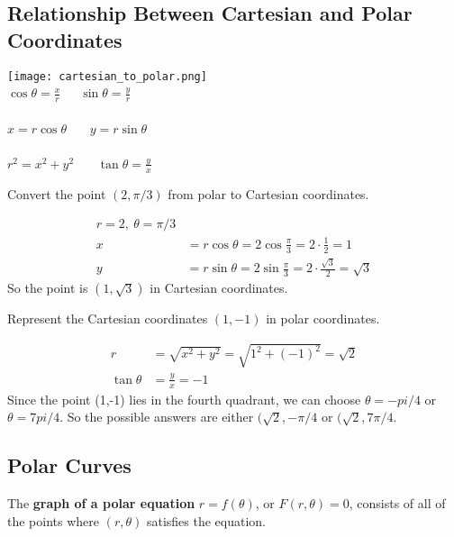   \subsection*{Relationship Between Cartesian and Polar Coordinates}
    \begin{center}
      \texttt{[image: cartesian\_to\_polar.png]} \\
      $\cos\theta = \frac{x}{r}$\ \ \ $\sin\theta = \frac{y}{r}$ \\~\\
      $x=r\cos\theta$ \ \ \  $y=r\sin\theta$ \\~\\
      $r^2 = x^2 + y^2$ \ \ \  $\tan\theta = \frac{y}{x}$
    \end{center}
    \begin{example}
      Convert the point $(2,\pi/3)$ from polar to Cartesian coordinates.
    \end{example}
    \begin{solution}
      \begin{align*}
        r=2,\ \theta=\pi/3 \\
        x&=r\cos\theta = 2\cos\frac{\pi}{3}=2\cdot\frac{1}{2}=1 \\
        y&=r\sin\theta = 2\sin\frac{\pi}{3}=2\cdot\frac{\sqrt{3}}{2}=\sqrt{3}
      \end{align*}
      So the point is $(1,\sqrt{3})$ in Cartesian coordinates.
    \end{solution}
    \begin{example}
      Represent the Cartesian coordinates $(1,-1)$ in polar coordinates.
    \end{example}
    \begin{solution}
      \begin{align*}
        r&=\sqrt{x^2 + y^2}=\sqrt{1^2 + (-1)^2} = \sqrt{2} \\
        \tan\theta &= \frac{y}{x} = -1
      \end{align*}
      Since the point (1,-1) lies in the fourth quadrant, we can choose $\theta=-pi/4$ or $\theta=7pi/4$. So the possible answers are either $(\sqrt{2},-\pi/4$ or $(\sqrt{2},7\pi/4$.
    \end{solution}
  \subsection*{Polar Curves}
    The \textbf{graph of a polar equation} $r=f(\theta)$, or $F(r,\theta) = 0$, consists of all of the points where $(r,\theta)$ satisfies the equation.
